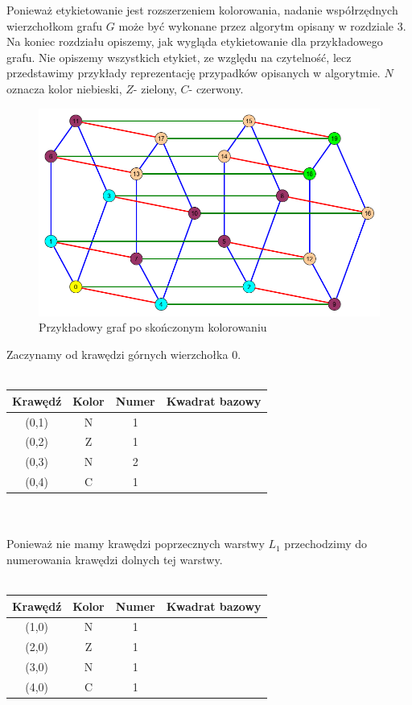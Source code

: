 \documentclass[12pt,a4paper,titlepage]{article}
\newcommand\tab[1][1cm]{\hspace*{#1}}
\begin{document}
Ponieważ etykietowanie jest rozszerzeniem kolorowania, nadanie współrzędnych wierzchołkom grafu $G$ może być wykonane przez algorytm opisany w rozdziale 3. Na koniec rozdziału opiszemy, jak wygląda etykietowanie dla przykładowego grafu. Nie opiszemy wszystkich etykiet, ze względu na czytelność, lecz przedstawimy przykłady reprezentację przypadków opisanych w algorytmie. $N$ oznacza kolor niebieski, $Z$- zielony, $C$- czerwony.
\newpage
\begin{figure}[h]
\centering
\includegraphics[width = 11.5cm]{kol5.png}
\caption{Przykładowy graf po skończonym kolorowaniu}
\end{figure}
\tab[-0.6cm]Zaczynamy od krawędzi górnych wierzchołka $0$.\\
\\
\begin{tabular}{|c|c|c|c|}\hline
Krawędź & Kolor & Numer & Kwadrat bazowy \\ \hline
(0,1) & N & 1 & \\ \hline 
(0,2) & Z & 1 & \\ \hline
(0,3) & N & 2 & \\ \hline
(0,4) & C & 1 & \\ \hline 
\end{tabular}
\\
\\
Ponieważ nie mamy krawędzi poprzecznych warstwy $L_1$ przechodzimy do numerowania krawędzi dolnych tej warstwy.\\
\\
\begin{tabular}{|c|c|c|c|}\hline
Krawędź & Kolor & Numer & Kwadrat bazowy \\ \hline
(1,0) & N & 1 & \\ \hline 
(2,0) & Z & 1 & \\ \hline
(3,0) & N & 1 & \\ \hline
(4,0) & C & 1 & \\ \hline 
\end{tabular}
\end{document}
